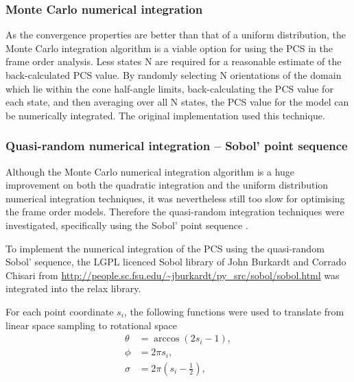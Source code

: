 
\subsubsection{Monte Carlo numerical integration}

As the convergence properties are better than that of a uniform distribution, the Monte Carlo integration algorithm is a viable option for using the PCS in the frame order analysis.
Less states N are required for a reasonable estimate of the back-calculated PCS value.
By randomly selecting N orientations of the domain which lie within the cone half-angle limits, back-calculating the PCS value for each state, and then averaging over all N states, the PCS value for the model can be numerically integrated.
The original implementation used this technique.




\subsubsection{Quasi-random numerical integration -- Sobol' point sequence}

Although the Monte Carlo numerical integration algorithm is a huge improvement on both the quadratic integration and the uniform distribution numerical integration techniques, it was nevertheless still too slow for optimising the frame order models.
Therefore the quasi-random integration techniques were investigated, specifically using the Sobol' point sequence \citep{Sobol67}.

To implement the numerical integration of the PCS using the quasi-random Sobol' sequence, the LGPL licenced Sobol library of John Burkardt and Corrado Chisari from \url{http://people.sc.fsu.edu/~jburkardt/py_src/sobol/sobol.html} was integrated into the relax library.

For each point coordinate $s_i$, the following functions were used to translate from linear space sampling to rotational space
\begin{subequations}
\begin{align}
    \theta &= \arccos(2s_i - 1), \\
    \phi   &= 2 \pi s_i, \\
    \sigma &= 2 \pi (s_i - \tfrac{1}{2}),
\end{align}
\end{subequations}

